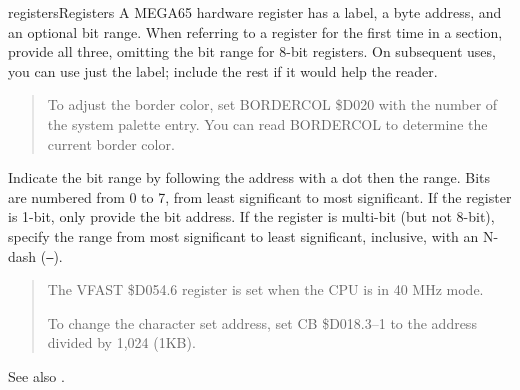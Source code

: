 \begin{sgentry}{registers}{Registers}
    A MEGA65 hardware register has a label, a byte address, and an optional bit range. When referring to a register for the first time in a section, provide all three, omitting the bit range for 8-bit registers. On subsequent uses, you can use just the label; include the rest if it would help the reader.

    \begin{quote}
        To adjust the border color, set BORDERCOL \$D020 with the number of the system palette entry. You can read BORDERCOL to determine the current border color.
    \end{quote}

    Indicate the bit range by following the address with a dot then the range. Bits are numbered from 0 to 7, from least significant to most significant. If the register is 1-bit, only provide the bit address. If the register is multi-bit (but not 8-bit), specify the range from most significant to least significant, inclusive, with an N-dash (\texttt{--}).

    \begin{quote}
        The VFAST \$D054.6 register is set when the CPU is in 40 MHz mode.

        To change the character set address, set CB \$D018.3--1 to the address divided by 1,024 (1KB).
    \end{quote}

    See also .
\end{sgentry}

